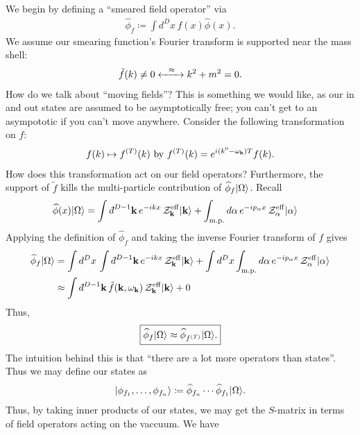 \documentclass[11pt]{article}
\begin{document}
We begin by defining a ``smeared field operator'' via
\begin{align*}
    \widehat{\phi}_f \coloneqq \int d^D x \, f(x) \widehat{\phi}(x).
\end{align*}
We assume our smearing function's Fourier transform is supported 
near the mass shell:
\begin{align*}
    \tilde{f}(k) \neq 0 \xleftrightarrow{\: \: \: \: \approx \: \: \: \:} k^2 + m^2 = 0.
\end{align*}
How do we talk about ``moving fields''? This is something we
would like, as our in and out states are assumed to be asymptotically
free; you can't get to an asympototic if you can't move anywhere. 
Consider the following transformation on $f$:
\begin{align*}
    f(k) \mapsto f^{(T)}(k) \text{ by } f^{(T)}(k) = e^{i(k^0 - \omega_{\mathbf{k}})T} f(k).
\end{align*}
How does this transformation act on our field operators?
Furthermore, the support of $\tilde{f}$ kills the
multi-particle contribution of $\widehat{\phi}_{f} \lvert\Omega\rangle$.
Recall
\begin{align*}
    \widehat{\phi}(x) \ket{\Omega} & = \int \dbar^{D - 1} \bfk \, e^{-ikx}\, \mathcal{Z}^{\rm eff}_{\bfk} \ket{\bfk}
    + \int_{\rm m.p.} d\alpha \, e^{-ip_\alpha x} \, \mathcal{Z}^{\rm eff}_{\alpha} \ket{\alpha}
\end{align*}
Applying the definition of $\widehat{\phi}_f$ and taking the inverse 
Fourier transform of $f$ gives
\begin{align*}
    \widehat{\phi}_f \ket{\Omega} & = \int d^D x \, \int \dbar^{D - 1} \bfk \, e^{-ikx}\, \mathcal{Z}^{\rm eff}_{\bfk} \ket{\bfk}
    + \int d^D x \int_{\rm m.p.} d\alpha \, e^{-ip_\alpha x} \, \mathcal{Z}^{\rm eff}_{\alpha} \ket{\alpha}\\
    & \approx \int \dbar^{D - 1} \bfk \, \tilde{f}(\bfk, \omega_\bfk)\, \mathcal{Z}^{\rm eff}_{\bfk} \ket{\bfk} + 0
\end{align*}
Thus,
\begin{align*}
    \boxed{\widehat{\phi}_f \lvert\Omega\rangle \approx \widehat{\phi}_{f^{(T)}} \lvert\Omega\rangle.}
\end{align*}
The intuition behind this is that ``there are a lot more operators than
states''. Thus we may define our states as
\begin{align*}
    \lvert\phi_{f_1}, \ldots, \phi_{f_n}\rangle \coloneqq \widehat{\phi}_{f_n} \cdots \widehat{\phi}_{f_1} \lvert\Omega\rangle.
\end{align*}
Thus, by taking inner products of our states, we may get the $S$-matrix
in terms of field operators acting on the vaccuum. We have 
\end{document}
